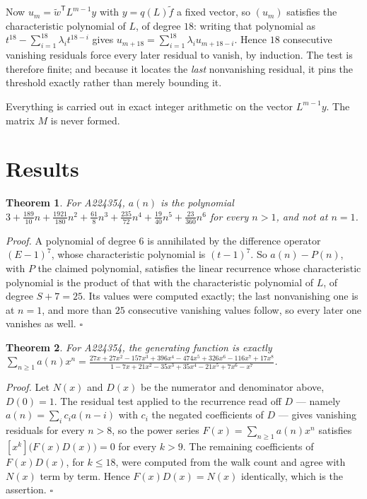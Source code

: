 \documentclass[11pt]{article}
\newtheorem{theorem}{Theorem}
\theoremstyle{definition}
\begin{document}
Now $u_m = \tilde w^{\mathsf T} L^{m-1} y$ with $y = q(L)\tilde f$ a fixed vector, so $(u_m)$ satisfies the characteristic polynomial of $L$, of degree $18$: writing that polynomial as $t^{18} - \sum_{i=1}^{18} \lambda_i t^{18-i}$ gives $u_{m+18} = \sum_{i=1}^{18} \lambda_i u_{m+18-i}$. Hence $18$ consecutive vanishing residuals force every later residual to vanish, by induction. The test is therefore finite; and because it locates the {\itshape last} nonvanishing residual, it pins the threshold exactly rather than merely bounding it.

Everything is carried out in exact integer arithmetic on the vector $L^{m-1}y$. The matrix $M$ is never formed.

\section{Results}

\begin{theorem} For A224354, $a(n)$ is the polynomial $3 + \frac{189}{10}n + \frac{1921}{180}n^{2} + \frac{61}{8}n^{3} + \frac{235}{72}n^{4} + \frac{19}{40}n^{5} + \frac{23}{360}n^{6}$ for every $n > 1$, and not at $n = 1$.\end{theorem}

{\itshape Proof.} A polynomial of degree $6$ is annihilated by the difference operator $(E-1)^{7}$, whose characteristic polynomial is $(t-1)^{7}$. So $a(n) - P(n)$, with $P$ the claimed polynomial, satisfies the linear recurrence whose characteristic polynomial is the product of that with the characteristic polynomial of $L$, of degree $S + 7 = 25$. Its values were computed exactly; the last nonvanishing one is at $n = 1$, and more than $25$ consecutive vanishing values follow, so every later one vanishes as well. $\square$

\begin{theorem} For A224354, the generating function is exactly $\sum_{n\ge 1} a(n)x^n = \frac{27x + 27x^{2} - 157x^{3} + 396x^{4} - 474x^{5} + 326x^{6} - 116x^{7} + 17x^{8}}{1 - 7x + 21x^{2} - 35x^{3} + 35x^{4} - 21x^{5} + 7x^{6} - x^{7}}$.\end{theorem}

{\itshape Proof.} Let $N(x)$ and $D(x)$ be the numerator and denominator above, $D(0)=1$. The residual test applied to the recurrence read off $D$ --- namely $a(n) = \sum_i c_i a(n-i)$ with $c_i$ the negated coefficients of $D$ --- gives vanishing residuals for every $n > 8$, so the power series $F(x)=\sum_{n\ge 1}a(n)x^n$ satisfies $[x^k]\bigl(F(x)D(x)\bigr) = 0$ for every $k > 9$. The remaining coefficients of $F(x)D(x)$, for $k \le 18$, were computed from the walk count and agree with $N(x)$ term by term. Hence $F(x)D(x) = N(x)$ identically, which is the assertion. $\square$
\end{document}
